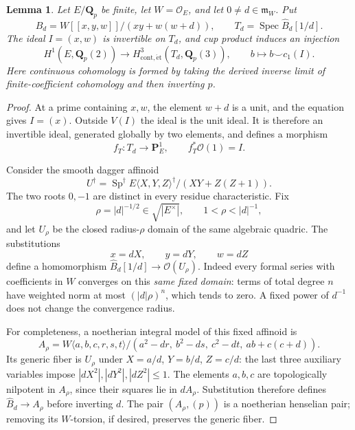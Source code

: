 \documentclass[11pt,a4paper]{amsart}
\numberwithin{equation}{section}
\newtheorem{lemma}[theorem]{Lemma}
\theoremstyle{definition}
\theoremstyle{remark}
\newcommand{\Q}{\mathbf Q}
\newcommand{\PP}{\mathbf P}
\newcommand{\OO}{\mathcal O}
\newcommand{\Spec}{\operatorname{Spec}}
\begin{document}
\begin{lemma}\label{d3:lem:completedcup}
Let $E/\Q_p$ be finite, let $W=\OO_E$, and let $0\ne d\in\mathfrak m_W$. Put
\[
\widehat B_d=W[[x,y,w]]/(xy+w(w+d)),\qquad
T_d=\Spec\widehat B_d[1/d].
\]
The ideal $I=(x,w)$ is invertible on $T_d$, and cup product induces an injection
\[
H^1(E,\Q_p(2))\longrightarrow
H^3_{\mathrm{cont},\mathrm{\acute et}}(T_d,\Q_p(3)),
\qquad b\longmapsto b\smile c_1(I).
\]
Here continuous cohomology is formed by taking the derived inverse limit of finite-coefficient cohomology and then inverting $p$.
\end{lemma}
\begin{proof}
At a prime containing $x,w$, the element $w+d$ is a unit, and the equation gives $I=(x)$. Outside $V(I)$ the ideal is the unit ideal. It is therefore an invertible ideal, generated globally by two elements, and defines a morphism
\[
f_T:T_d\longrightarrow\PP^1_E,\qquad f_T^*\OO(1)=I.
\]

Consider the smooth dagger affinoid
\[
U^\dagger=\operatorname{Sp}^\dagger
E\langle X,Y,Z\rangle^\dagger/(XY+Z(Z+1)).
\]
The two roots $0,-1$ are distinct in every residue characteristic. Fix
\[
\rho=|d|^{-1/2}\in\sqrt{|E^\times|},\qquad 1<\rho<|d|^{-1},
\]
and let $U_\rho$ be the closed radius-$\rho$ domain of the same algebraic quadric. The substitutions
\begin{equation}\label{d3:eq:fixedradius}
x=dX,\qquad y=dY,\qquad w=dZ
\end{equation}
define a homomorphism $\widehat B_d[1/d]\to\OO(U_\rho)$. Indeed every formal series with coefficients in $W$ converges on this \emph{same fixed domain}: terms of total degree $n$ have weighted norm at most $(|d|\rho)^n$, which tends to zero. A fixed power of $d^{-1}$ does not change the convergence radius.

For completeness, a noetherian integral model of this fixed affinoid is
\[
 A_\rho=W\langle a,b,c,r,s,t\rangle/
 (a^2-dr,\ b^2-ds,\ c^2-dt,\ ab+c(c+d)).
\]
Its generic fiber is $U_\rho$ under $X=a/d$, $Y=b/d$, $Z=c/d$:
the last three auxiliary variables impose
$|dX^2|,|dY^2|,|dZ^2|\leq1$.
The elements $a,b,c$ are topologically nilpotent in $A_\rho$,
since their squares lie in $dA_\rho$. Substitution therefore defines
$\widehat B_d\to A_\rho$ before inverting $d$.
The pair $(A_\rho,(p))$ is a noetherian henselian pair; removing its
$W$-torsion, if desired, preserves the generic fiber.


\end{proof}
\end{document}
